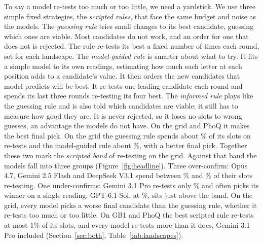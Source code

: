To say a model re-tests too much or too little, we need a yardstick. We use three simple fixed strategies, the \emph{scripted rules}, that face
the same budget and noise as the models. The \emph{guessing rule} tries small changes to its best candidate, guessing which ones are viable. Most candidates do not work, and an order for one that does not is rejected. The rule re-tests its best a fixed number of times each round, set for each landscape. The \emph{model-guided rule} is smarter about what to try. It fits a simple model to its own readings, estimating how much each letter at each position adds to a candidate's value. It then orders the new candidates that model predicts will be best. It re-tests one leading candidate each round and
spends its last three rounds re-testing its four best. The \emph{informed rule} plays like the guessing rule and is also told which candidates are viable; it still has to measure how good they are. It is
never rejected, so it loses no slots to wrong guesses, an advantage the models do not have. On the grid and PhoQ it
makes the best final pick. On the grid the guessing rule
spends about \nGuessShareInt\% of its slots on re-tests and the model-guided rule about \nBandHiInt\%, with a better final pick.
Together these two mark the \emph{scripted band} of re-testing on the grid. Against that band the models fall into three groups (Figure~\ref{fig:headline}). Three
over-confirm: Opus 4.7, Gemini 2.5 Flash and DeepSeek V3.1 spend between \nShareOpusint\% and \nShareFlashint\% of
their slots re-testing. One under-confirms: Gemini 3.1 Pro re-tests only \nShareProint\% and often picks its
winner on a single reading. GPT-6.1 Sol, at \nShareSolint\%, sits just above the band. On the grid, every model picks a worse final
candidate than the guessing rule, whether it re-tests too much or too little. On GB1 and PhoQ
the best scripted rule re-tests at most 1\% of its slots, and every model re-tests more than it does, Gemini 3.1 Pro
included (Section~\ref{sec:both}, Table~\ref{tab:landscapes}).

